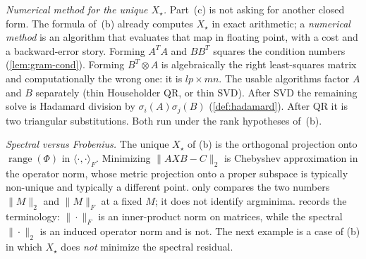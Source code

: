 \documentclass[11pt,a4paper]{article}
\begin{document}
\begin{remark}[Parts (c)--(d)]
\label{rem:p3-cd}
\emph{Numerical method for the unique \(X_{\star}\).}
Part~(c) is not asking for another closed form. The formula of~(b) already computes \(X_{\star}\) in exact arithmetic; a \emph{numerical method} is an algorithm that evaluates that map in floating point, with a cost and a backward-error story. Forming \(A^{T}A\) and \(BB^{T}\) squares the condition numbers (\cref{lem:gram-cond}). Forming \(B^{T}\otimes A\) is algebraically the right least-squares matrix and computationally the wrong one: it is \(lp\times mn\). The usable algorithms factor \(A\) and \(B\) separately (thin Householder QR, or thin SVD). After SVD the remaining solve is Hadamard division by \(\sigma_{i}(A)\sigma_{j}(B)\) (\cref{def:hadamard}). After QR it is two triangular substitutions. Both run under the rank hypotheses of~(b).

\emph{Spectral versus Frobenius.}
The unique \(X_{\star}\) of (b) is the orthogonal projection onto \(\operatorname{range}(\Phi)\) in \(\langle\cdot,\cdot\rangle_{F}\). Minimizing \(\|AXB-C\|_{2}\) is Chebyshev approximation in the operator norm, whose metric projection onto a proper subspace is typically non-unique and typically a different point.  only compares the two numbers \(\|M\|_{2}\) and \(\|M\|_{F}\) at a fixed \(M\); it does not identify argminima.  records the terminology: \(\|\cdot\|_{F}\) is an inner-product norm on matrices, while the spectral \(\|\cdot\|_{2}\) is an induced operator norm and is not. The next example is a case of (b) in which \(X_{\star}\) does \emph{not} minimize the spectral residual.
\end{remark}
\end{document}
